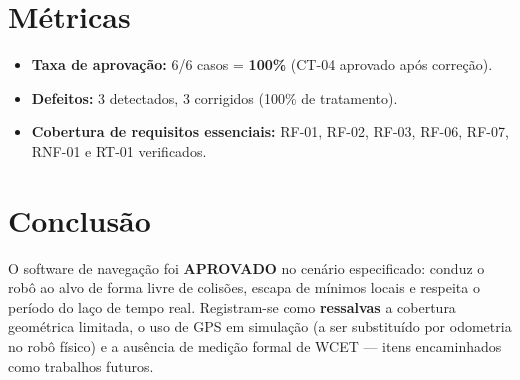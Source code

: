 \section{Métricas}
\begin{itemize}[noitemsep,topsep=2pt]
  \item \textbf{Taxa de aprovação:} 6/6 casos = \textbf{100\%} (CT-04 aprovado após correção).
  \item \textbf{Defeitos:} 3 detectados, 3 corrigidos (100\% de tratamento).
  \item \textbf{Cobertura de requisitos essenciais:} RF-01, RF-02, RF-03, RF-06, RF-07, RNF-01 e RT-01 verificados.
\end{itemize}

\section{Conclusão}
O software de navegação foi \textbf{APROVADO} no cenário especificado: conduz o robô ao alvo de forma livre de colisões, escapa de mínimos locais e respeita o período do laço de tempo real. Registram-se como \textbf{ressalvas} a cobertura geométrica limitada, o uso de GPS em simulação (a ser substituído por odometria no robô físico) e a ausência de medição formal de WCET --- itens encaminhados como trabalhos futuros.


